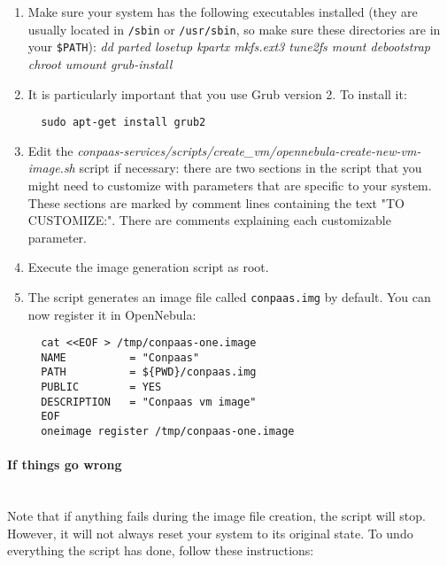 \documentclass[10pt]{article}
\begin{document}
\begin{enumerate}
\item Make sure your system has the following executables installed
  (they are usually located in \verb+/sbin+ or \verb+/usr/sbin+, so
  make sure these directories are in your \verb+$PATH+): %
  \emph{dd parted losetup kpartx mkfs.ext3 tune2fs mount debootstrap
    chroot umount grub-install}
\item It is particularly important that you use Grub version 2. To
  install it:
  \begin{verbatim}
  sudo apt-get install grub2
  \end{verbatim}
\item Edit the
  \textit{conpaas-services/scripts/create\_vm/opennebula-create-new-vm-image.sh} script
  if necessary: there are two sections in the script that you might need
  to customize with parameters that are specific to your system. These
  sections are marked by comment lines containing the text "TO CUSTOMIZE:".
  There are comments explaining each customizable parameter. 
\item Execute the image generation script as root.
\item The script generates an image file called \verb+conpaas.img+
  by default. You can now register it in OpenNebula:

\vspace{10 mm}

\begin{verbatim}
  cat <<EOF > /tmp/conpaas-one.image
  NAME          = "Conpaas"
  PATH          = ${PWD}/conpaas.img
  PUBLIC        = YES
  DESCRIPTION   = "Conpaas vm image"
  EOF
  oneimage register /tmp/conpaas-one.image
\end{verbatim}
\end{enumerate}

\paragraph{If things go wrong}~\\

Note that if anything fails during the image file creation, the script
will stop. However, it will not always reset your system to its
original state. To undo everything the script has done, follow these
instructions:
\end{document}
